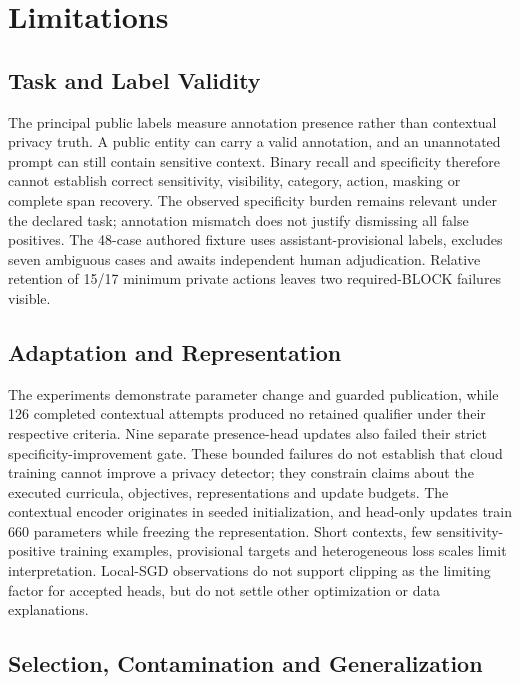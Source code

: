 \documentclass[conference]{IEEEtran}
\begin{document}
\section{Limitations}
\label{sec:limitations}

\subsection{Task and Label Validity}

The principal public labels measure annotation presence rather than contextual privacy truth. A public entity can carry a valid annotation, and an unannotated prompt can still contain sensitive context. Binary recall and specificity therefore cannot establish correct sensitivity, visibility, category, action, masking or complete span recovery. The observed specificity burden remains relevant under the declared task; annotation mismatch does not justify dismissing all false positives. The 48-case authored fixture uses assistant-provisional labels, excludes seven ambiguous cases and awaits independent human adjudication. Relative retention of 15/17 minimum private actions leaves two required-BLOCK failures visible.

\subsection{Adaptation and Representation}

The experiments demonstrate parameter change and guarded publication, while 126 completed contextual attempts produced no retained qualifier under their respective criteria. Nine separate presence-head updates also failed their strict specificity-improvement gate. These bounded failures do not establish that cloud training cannot improve a privacy detector; they constrain claims about the executed curricula, objectives, representations and update budgets. The contextual encoder originates in seeded initialization, and head-only updates train 660 parameters while freezing the representation. Short contexts, few sensitivity-positive training examples, provisional targets and heterogeneous loss scales limit interpretation. Local-SGD observations do not support clipping as the limiting factor for accepted heads, but do not settle other optimization or data explanations.

\subsection{Selection, Contamination and Generalization}
\end{document}
